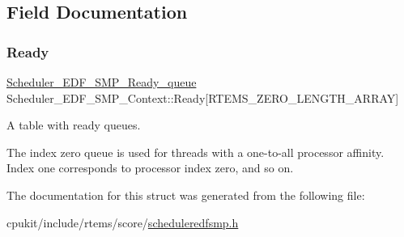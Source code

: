 \subsection{Field Documentation}
\mbox{\label{structScheduler__EDF__SMP__Context_a553f8fcbd76b9c1d61ffb72fc15a4a9e}} 
\subsubsection{\texorpdfstring{Ready}{Ready}}
{\footnotesize\ttfamily \mbox{\hyperlink{structScheduler__EDF__SMP__Ready__queue}{Scheduler\+\_\+\+E\+D\+F\+\_\+\+S\+M\+P\+\_\+\+Ready\+\_\+queue}} Scheduler\+\_\+\+E\+D\+F\+\_\+\+S\+M\+P\+\_\+\+Context\+::\+Ready\mbox{[}R\+T\+E\+M\+S\+\_\+\+Z\+E\+R\+O\+\_\+\+L\+E\+N\+G\+T\+H\+\_\+\+A\+R\+R\+AY\mbox{]}}



A table with ready queues. 

The index zero queue is used for threads with a one-\/to-\/all processor affinity. Index one corresponds to processor index zero, and so on. 

The documentation for this struct was generated from the following file\+:\begin{DoxyCompactItemize}
\item 
cpukit/include/rtems/score/\mbox{\hyperlink{scheduleredfsmp_8h}{scheduleredfsmp.\+h}}\end{DoxyCompactItemize}
